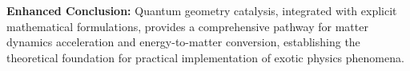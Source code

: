 \documentclass[12pt]{article}
\begin{document}
\textbf{Enhanced Conclusion:} Quantum geometry catalysis, integrated with explicit mathematical formulations, provides a comprehensive pathway for matter dynamics acceleration and energy-to-matter conversion, establishing the theoretical foundation for practical implementation of exotic physics phenomena.
\end{document}
